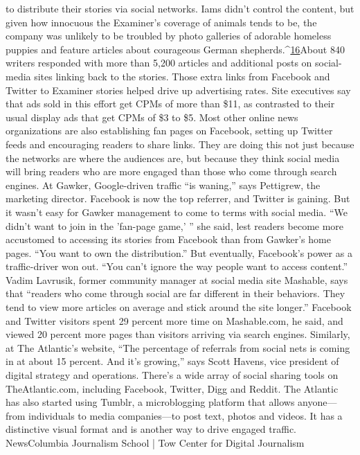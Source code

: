 to distribute their stories via social networks. Iams didn't control the content, but
given how innocuous the Examiner's coverage of animals tends to be, the company
was unlikely to be troubled by photo galleries of adorable homeless puppies
and feature articles about courageous German shepherds.^{\href{#endnotes-chapter-2}{16}}About 840 writers
responded with more than 5,200 articles and additional posts on social-media
sites linking back to the stories. Those extra links from Facebook and Twitter to
Examiner stories helped drive up advertising rates. Site executives say that ads
sold in this effort get CPMs of more than \$11, as contrasted to their usual display
ads that get CPMs of \$3 to \$5.
Most other online news organizations are also establishing fan pages on Facebook,
setting up Twitter feeds and encouraging readers to share links. They are
doing this not just because the networks are where the audiences are, but because
they think social media will bring readers who are more engaged than those
who come through search engines. At Gawker, Google-driven traffic ``is waning,''
says Pettigrew, the marketing director. Facebook is now the top referrer, and
Twitter is gaining. But it wasn't easy for Gawker management to come to terms
with social media. ``We didn't want to join in the 'fan-page game,' '' she said, lest
readers become more accustomed to accessing its stories from Facebook than
from Gawker's home pages. ``You want to own the distribution.'' But eventually,
Facebook's power as a traffic-driver won out. ``You can't ignore the way people
want to access content.''
Vadim Lavrusik, former community manager at social media site Mashable,
says that ``readers who come through social are far different in their behaviors.
They tend to view more articles on average and stick around the site longer.''
Facebook and Twitter visitors spent 29 percent more time on Mashable.com, he
said, and viewed 20 percent more pages than visitors arriving via search engines.
Similarly, at The Atlantic's website, ``The percentage of referrals from social
nets is coming in at about 15 percent. And it's growing,'' says Scott Havens, vice
president of digital strategy and operations. There's a wide array of social sharing
tools on TheAtlantic.com, including Facebook, Twitter, Digg and Reddit. The
Atlantic has also started using Tumblr, a microblogging platform that allows anyone—
from individuals to media companies—to post text, photos and videos. It
has a distinctive visual format and is another way to drive engaged traffic. NewsColumbia
Journalism School | Tow Center for Digital Journalism
